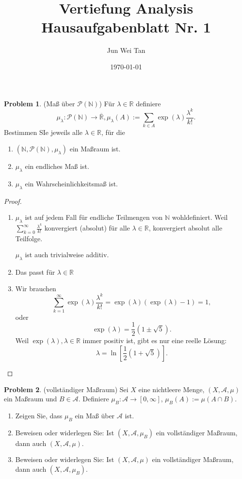 \documentclass[prb,12pt]{revtex4-2}
\theoremstyle{definition}
\newtheorem{Problem}{Problem}
\theoremstyle{definition}
\newenvironment{parts}{\begin{enumerate}[label=(\alph*)]}{\end{enumerate}}
\newcommand{\N}{\mathbb{N}}
\newcommand{\R}{\mathbb{R}}
\begin{document}
	\title{Vertiefung Analysis Hausaufgabenblatt Nr. 1}
	\author{Jun Wei Tan}
	\date{\today}
\maketitle
\begin{Problem}
	(Maß über $\mathcal{P}(\N)$) Für $\lambda \in \R$ definiere
	\[
	\mu_\lambda:\mathcal{P}(\N)\to \overline{\R}, \mu_\lambda(A):=\sum_{k\in A} \exp(\lambda) \frac{\lambda^k}{k!}
	.\] 
	Bestimmen SIe jeweils alle $\lambda\in \R$, f\"{u}r die
	\begin{parts}
		\item $(\N, \mathcal{P}(\N), \mu_\lambda)$ ein Maßraum ist.
		\item $\mu_\lambda$ ein endliches Maß ist.
		\item $\mu_\lambda$ ein Wahrscheinlichkeitsmaß ist.
	\end{parts}
\end{Problem}
\begin{proof}
	\begin{parts}
	\item $\mu_\lambda$ ist auf jedem Fall f\"{u}r endliche Teilmengen von $\N$ wohldefiniert. Weil $\sum_{k=0}^\infty \frac{\lambda^k}{k!}$ konvergiert (absolut) f\"{u}r alle $\lambda\in\R$, konvergiert absolut alle Teilfolge. 

		$\mu_\lambda$ ist auch trivialweise additiv.
	\item Das passt f\"{u}r $\lambda \in \R$ 
	\item Wir brauchen 
		\[
		\sum_{k=1}^{\infty} \exp(\lambda) \frac{\lambda^k}{k!}=\exp(\lambda)(\exp(\lambda)-1)=1
		,\] 
		oder 
		\[
		\exp(\lambda)=\frac{1}{2}(1\pm \sqrt{5} )
		.\]
		Weil $\exp(\lambda), \lambda \in \R$ immer positiv ist, gibt es nur eine reelle Lösung:
		\[
		\lambda=\ln\left[ \frac{1}{2}\left( 1+\sqrt{5}  \right)  \right] 
		.\] 
	\end{parts}
\end{proof}
\begin{Problem}
	(vollständiger Maßraum) Sei $X$ eine nichtleere Menge, $(X, \mathcal{A}, \mu)$ ein Maßraum und $B \in \mathcal{A}$. Definiere $\mu_B : \mathcal{A} \to [0, \infty]$, $\mu_B (A) := \mu(A \cap B)$.
	\begin{parts}
	\item Zeigen Sie, dass $\mu_B$ ein Maß über $\mathcal{A}$ ist.
	\item  Beweisen oder widerlegen Sie: Ist $(X, \mathcal{A}, \mu_B)$ ein vollständiger Maßraum, dann auch $(X, \mathcal{A}, \mu)$.
	\item  Beweisen oder widerlegen Sie: Ist $(X, \mathcal{A}, \mu)$ ein vollständiger Maßraum, dann auch $(X, \mathcal{A}, \mu_B)$.
	\end{parts}
\end{Problem}
\end{document}

